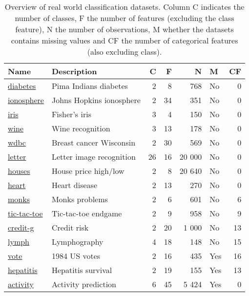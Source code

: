\begin{table}
\centering
\begin{tabular}[htp]{ l l r r r l r }
    Name & Description & C & F & N & M & CF \\ \hline
    \href{https://www.openml.org/d/37}{diabetes} & Pima Indians diabetes & 2 & 8 & 768 & No & 0 \\
    \href{https://www.openml.org/d/59}{ionosphere} & Johns Hopkins ionosphere & 2 & 34 & 351 & No & 0 \\
    \href{https://www.openml.org/d/61}{iris} & Fisher's iris & 3 & 4 & 150 & No & 0 \\
    \href{https://www.openml.org/d/187}{wine} & Wine recognition & 3 & 13 & 178 & No & 0 \\
    \href{https://www.openml.org/d/1510}{wdbc} & Breast cancer Wisconsin & 2 & 30 & 569 & No & 0 \\
    \href{https://www.openml.org/d/6}{letter} & Letter image recognition & 26 & 16 & 20 000 & No & 0 \\
    \href{https://www.openml.org/d/823}{houses} & House price high/low & 2 & 8 & 20 640 & No & 0 \\
    \href{https://www.openml.org/d/53}{heart} & Heart disease & 2 & 13 & 270 & No & 0 \\
    \href{https://www.openml.org/d/334}{monks} & Monks problems & 2 & 6 & 601 & No & 6 \\
    \href{https://www.openml.org/d/50}{tic-tac-toe} & Tic-tac-toe endgame & 2 & 9 & 958 & No & 9 \\
    \href{https://www.openml.org/d/31}{credit-g} & Credit risk & 2 & 20 & 1 000 & No & 13 \\
    \href{https://www.openml.org/d/10}{lymph} & Lymphography & 4 & 18 & 148 & No & 15 \\
    \href{https://www.openml.org/d/56}{vote} & 1984 US votes & 2 & 16 & 435 & Yes & 16 \\
    \href{https://www.openml.org/d/55}{hepatitis} & Hepatitis survival & 2 & 19 & 155 & Yes & 13 \\
    \href{http://www.cis.fordham.edu/wisdm/dataset.php}{activity} & Activity prediction & 6 & 45 & 5 424 & Yes & 0 \\
\end{tabular}
\caption{Overview of real world classification datasets. Column C indicates the number of classes, F the number of features (excluding the class feature), N the number of observations, M whether the datasets contains missing values and CF the number of categorical features (also excluding class).}%
\label{tbl:datasets}
\end{table}

